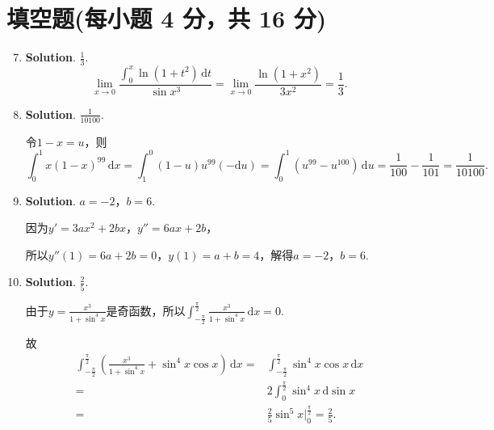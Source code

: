 \documentclass[../main.tex]{subfiles}
\begin{document}
\section{填空题(每小题 4 分，共 16 分)}
\begin{enumerate}
    \setcounter{enumi}{6}
    \item \textbf{Solution}. $\frac{1}{3}$.
          \[
              \lim_{x\to0}\frac{\displaystyle\int_{0}^{x}\ln(1+t^{2})\,\mathrm{d}t}{\sin
                  x^{3}}=\lim_{x\to0}\frac{\ln(1+x^{2})}{3x^{2}}=\frac{1}{3}.
          \]

    \item \textbf{Solution}. $\frac{1}{10100}$.

          令$1-x=u$，则
          \[
              \int_{0}^{1}x(1-x)^{99}\,\mathrm{d}x=\int_{1}^{0}(1-u)u^{99}(-\mathrm{d}
              u)=\int_{0}^{1}(u^{99}-u^{100})\,\mathrm{d}u=\frac{1}{100}-\frac{1}{101}=\frac{1}{10100}.
          \]

    \item \textbf{Solution}. $a=-2$，$b=6$.

          因为$y'=3ax^{2}+2bx$，$y''=6ax+2b$，

          所以$y''(1)=6a+2b=0$，$y(1)=a+b=4$，解得$a=-2$，$b=6$.

    \item \textbf{Solution}. $\frac{2}{5}$.

          由于$y=\frac{x^{3}}{1+\sin^{4} x}$是奇函数，所以$\int_{-\frac{\pi}{2}}^{\frac{\pi}{2}}
              \frac{x^{3}}{1+\sin^{4} x}\,\mathrm{d}x=0$.

          故
          \[
              \begin{aligned}
                  \int_{-\frac{\pi}{2}}^{\frac{\pi}{2}}\left(\frac{x^3}{1+\sin^4 x}+\sin^{4} x\cos x\right)\,\mathrm{d}x = {} & \int_{-\frac{\pi}{2}}^{\frac{\pi}{2}}\sin^{4} x\cos x\,\mathrm{d}x \\
                  = {}                                                                                                        & 2\int_{0}^{\frac{\pi}{2}}\sin^{4} x\,\mathrm{d}\sin x              \\
                  = {}                                                                                                        & \frac{2}{5}\sin^{5} x\bigg|_{0}^{\frac{\pi}{2}}= \frac{2}{5}.
              \end{aligned}
          \]

\end{enumerate}
\end{document}
